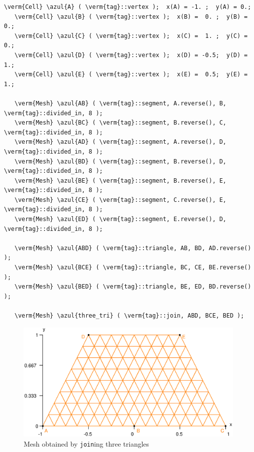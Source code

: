\begin{Verbatim}[commandchars=\\\{\},formatcom=\small\tt,frame=single,
   label=main-\ref{\numb section 1.\numb parag 4}.cpp,rulecolor=\color{coment},
   baselinestretch=0.94,framesep=2mm]
   \verm{Cell} \azul{A} ( \verm{tag}::vertex );  x(A) = -1. ;  y(A) = 0.;
   \verm{Cell} \azul{B} ( \verm{tag}::vertex );  x(B) =  0. ;  y(B) = 0.;
   \verm{Cell} \azul{C} ( \verm{tag}::vertex );  x(C) =  1. ;  y(C) = 0.;
   \verm{Cell} \azul{D} ( \verm{tag}::vertex );  x(D) = -0.5;  y(D) = 1.;
   \verm{Cell} \azul{E} ( \verm{tag}::vertex );  x(E) =  0.5;  y(E) = 1.;

   \verm{Mesh} \azul{AB} ( \verm{tag}::segment, A.reverse(), B, \verm{tag}::divided_in, 8 );
   \verm{Mesh} \azul{BC} ( \verm{tag}::segment, B.reverse(), C, \verm{tag}::divided_in, 8 );
   \verm{Mesh} \azul{AD} ( \verm{tag}::segment, A.reverse(), D, \verm{tag}::divided_in, 8 );
   \verm{Mesh} \azul{BD} ( \verm{tag}::segment, B.reverse(), D, \verm{tag}::divided_in, 8 );
   \verm{Mesh} \azul{BE} ( \verm{tag}::segment, B.reverse(), E, \verm{tag}::divided_in, 8 );
   \verm{Mesh} \azul{CE} ( \verm{tag}::segment, C.reverse(), E, \verm{tag}::divided_in, 8 );
   \verm{Mesh} \azul{ED} ( \verm{tag}::segment, E.reverse(), D, \verm{tag}::divided_in, 8 );

   \verm{Mesh} \azul{ABD} ( \verm{tag}::triangle, AB, BD, AD.reverse() );
   \verm{Mesh} \azul{BCE} ( \verm{tag}::triangle, BC, CE, BE.reverse() );
   \verm{Mesh} \azul{BED} ( \verm{tag}::triangle, BE, ED, BD.reverse() );

   \verm{Mesh} \azul{three_tri} ( \verm{tag}::join, ABD, BCE, BED );
\end{Verbatim}

\begin{figure}[ht] \centering
  \includegraphics[width=130mm]{three-tri}
  \caption{Mesh obtained by {\small\tt join}ing three triangles}
  \label{\numb section 1.\numb fig 7}
\end{figure}


